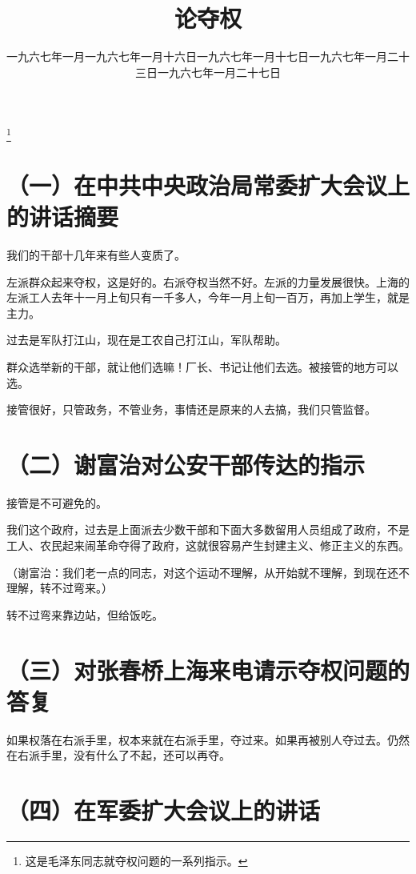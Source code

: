 
\title{论夺权}
\date{一九六七年一月}
\thanks{这是毛泽东同志就夺权问题的一系列指示。}
\maketitle


\date{一九六七年一月十六日}
\section*{（一）在中共中央政治局常委扩大会议上的讲话摘要}

我们的干部十几年来有些人变质了。

左派群众起来夺权，这是好的。右派夺权当然不好。左派的力量发展很快。上海的左派工人去年十一月上旬只有一千多人，今年一月上旬一百万，再加上学生，就是主力。

过去是军队打江山，现在是工农自己打江山，军队帮助。

群众选举新的干部，就让他们选嘛！厂长、书记让他们去选。被接管的地方可以选。

接管很好，只管政务，不管业务，事情还是原来的人去搞，我们只管监督。

\date{一九六七年一月十七日}
\section*{（二）谢富治对公安干部传达的指示}

接管是不可避免的。

我们这个政府，过去是上面派去少数干部和下面大多数留用人员组成了政府，不是工人、农民起来闹革命夺得了政府，这就很容易产生封建主义、修正主义的东西。

（谢富治：我们老一点的同志，对这个运动不理解，从开始就不理解，到现在还不理解，转不过弯来。）

转不过弯来靠边站，但给饭吃。

\date{一九六七年一月二十三日}
\section*{（三）对张春桥上海来电请示夺权问题的答复}

如果权落在右派手里，权本来就在右派手里，夺过来。如果再被别人夺过去。仍然在右派手里，没有什么了不起，还可以再夺。

\date{一九六七年一月二十七日}
\section*{（四）在军委扩大会议上的讲话}


